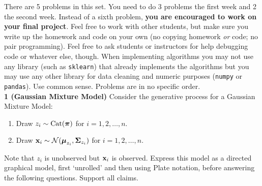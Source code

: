 \documentclass[12pt,letterpaper,fleqn]{hmcpset}
\begin{document}
There are 5 problems in this set. You need to do 3 problems the first week and 2 the second
week. Instead of a sixth problem, \textbf{you are encouraged to work on your final project}.
Feel free to work with other students, but make sure you write up the homework
and code on your own (no copying homework \textit{or} code; no pair programming).
Feel free to ask students or instructors for help debugging code or whatever else,
though.
When implementing algorithms you may not use any library (such as \texttt{sklearn})
that already implements the algorithms but you may use any other library for
data cleaning and numeric purposes (\texttt{numpy} or \texttt{pandas}). Use common
sense. Problems are in no specific order.\\[1em]

\textbf{1 (Gaussian Mixture Model)} Consider the generative process for a Gaussian
Mixture Model:
\begin{enumerate}[(1)]
    \item Draw $z_i \sim \mathrm{Cat}(\hbox{\boldmath$\pi$})$ for $i=1,2,\dots,n$.
    \item Draw ${\bf x}_i \sim {\cal N}(\hbox{\boldmath$\mu$}_{z_i}, \hbox{\boldmath$\Sigma$}_{z_i})$ for $i=1,2,\dots,n$.
\end{enumerate}
Note that $z_i$ is unobserved but ${\bf x}_i$ is observed.
Express this model as a directed graphical model, first `unrolled' and then using
Plate notation, before answering the following questions. Support all claims.
\end{document}
